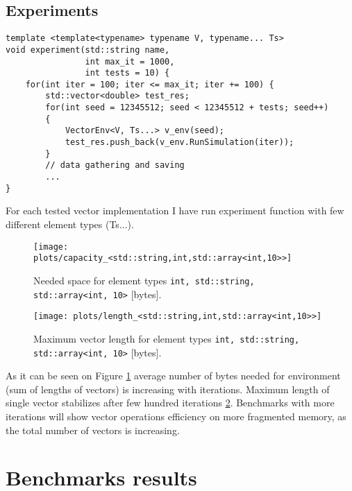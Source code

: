 \documentclass[inz, english, shortabstract]{iithesis}
\begin{document}
\section {Experiments}
\begin{lstlisting}[caption=experiment function]
template <template<typename> typename V, typename... Ts>
void experiment(std::string name, 
				int max_it = 1000, 
				int tests = 10) {
	for(int iter = 100; iter <= max_it; iter += 100) {
		std::vector<double> test_res;
		for(int seed = 12345512; seed < 12345512 + tests; seed++) 
		{
			VectorEnv<V, Ts...> v_env(seed);
			test_res.push_back(v_env.RunSimulation(iter));
		}
		// data gathering and saving
		...
}
\end{lstlisting}
For each tested vector implementation I have run experiment function with few different element types (Ts...). 

\begin{figure}[h!]
\texttt{[image: plots/capacity\_<std::string,int,std::array<int,10>>]}
\caption{Needed space for element types \lstinline{int, std::string, std::array<int, 10>} [bytes].}
\label{space_consumption}
\end{figure}

\begin{figure}[h!]
\texttt{[image: plots/length\_<std::string,int,std::array<int,10>>]}
\caption{Maximum vector length for element types \lstinline{int, std::string, std::array<int, 10>} [bytes].}
\label{vector_length}
\end{figure}


As it can be seen on Figure \ref{space_consumption} average number of bytes needed for environment (sum of lengths of vectors) is increasing with iterations. Maximum length of single vector stabilizes after few hundred iterations \ref{vector_length}. Benchmarks with more iterations will show vector operations efficiency on more fragmented memory, as the total number of vectors is increasing.

\chapter{Benchmarks results}
\end{document}
